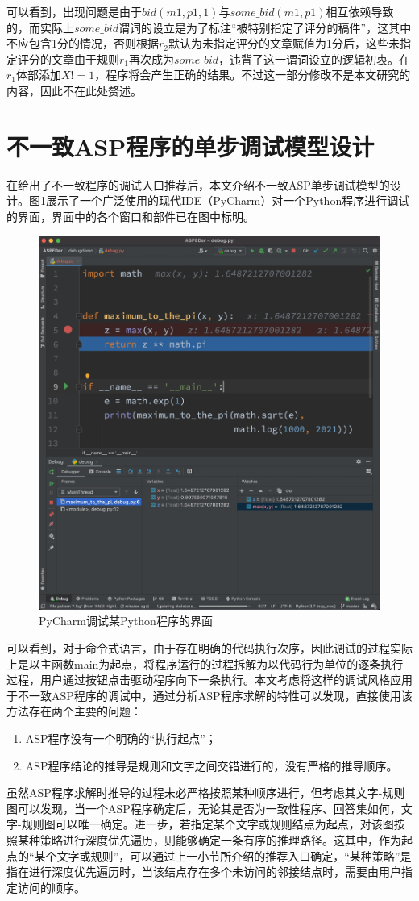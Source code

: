 \begin{example}
可以看到，出现问题是由于$bid(m1, p1, 1)$与$some\_bid(m1, p1)$相互依赖导致的，而实际上$some\_bid$谓词的设立是为了标注“被特别指定了评分的稿件”，这其中不应包含1分的情况，否则根据$r_2$默认为未指定评分的文章赋值为1分后，这些未指定评分的文章由于规则$r_1$再次成为$some\_bid$，违背了这一谓词设立的逻辑初衷。在$r_1$体部添加$X \mathrel{\mathtt{!=}} 1$，程序将会产生正确的结果。不过这一部分修改不是本文研究的内容，因此不在此处赘述。
\end{example}

\section{不一致ASP程序的单步调试模型设计}
在给出了不一致程序的调试入口推荐后，本文介绍不一致ASP单步调试模型的设计。图\ref{fig:dbgpycharm}展示了一个广泛使用的现代IDE（PyCharm）对一个Python程序进行调试的界面，界面中的各个窗口和部件已在图中标明。
\begin{figure}[t]
    \centering
    \includegraphics[height=.5\textwidth, valign=c]{figures/现代IDE调试界面.jpg}
    \caption{PyCharm调试某Python程序的界面}
    \label{fig:dbgpycharm}
\end{figure}
可以看到，对于命令式语言，由于存在明确的代码执行次序，因此调试的过程实际上是以主函数main为起点，将程序运行的过程拆解为以代码行为单位的逐条执行过程，用户通过按钮点击驱动程序向下一条执行。本文考虑将这样的调试风格应用于不一致ASP程序的调试中，通过分析ASP程序求解的特性可以发现，直接使用该方法存在两个主要的问题：
\begin{enumerate}[label=(\arabic*), topsep=0pt]
    \setlength\itemsep{-0.3em}
    \item ASP程序没有一个明确的“执行起点”；
    \item ASP程序结论的推导是规则和文字之间交错进行的，没有严格的推导顺序。
\end{enumerate}

虽然ASP程序求解时推导的过程未必严格按照某种顺序进行，但考虑其文字-规则图可以发现，当一个ASP程序确定后，无论其是否为一致性程序、回答集如何，文字-规则图可以唯一确定。进一步，若指定某个文字或规则结点为起点，对该图按照某种策略进行深度优先遍历，则能够确定一条有序的推理路径。这其中，作为起点的“某个文字或规则”，可以通过上一小节所介绍的推荐入口确定，“某种策略”是指在进行深度优先遍历时，当该结点存在多个未访问的邻接结点时，需要由用户指定访问的顺序。

